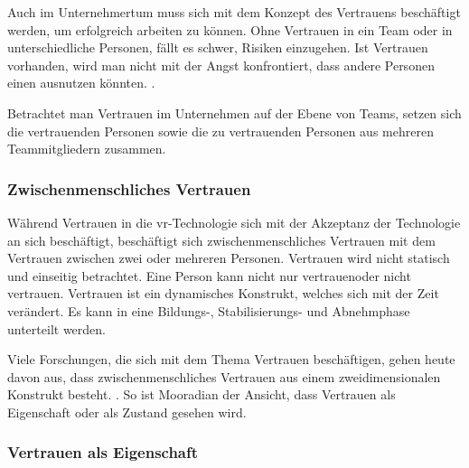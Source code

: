 \documentclass[a4paper,11pt]{article}%
\renewcommand{\\}{\vspace*{0.5\baselineskip} \newline}
\begin{document}
Auch im Unternehmertum muss sich mit dem Konzept des Vertrauens beschäftigt werden, um erfolgreich arbeiten zu können. Ohne Vertrauen in ein Team oder in unterschiedliche Personen, fällt es schwer, Risiken einzugehen. Ist Vertrauen vorhanden, wird man nicht mit der Angst konfrontiert, dass andere Personen einen ausnutzen könnten. \citep[p.1152]{breuer2016does}.

Betrachtet man Vertrauen im Unternehmen auf der Ebene von Teams, setzen sich die vertrauenden Personen sowie die zu vertrauenden Personen aus mehreren Teammitgliedern zusammen.
 

		\subsubsection{Zwischenmenschliches Vertrauen}
Während Vertrauen in die \ac{vr}-Technologie sich mit der Akzeptanz der Technologie an sich beschäftigt, beschäftigt sich zwischenmenschliches Vertrauen mit dem Vertrauen zwischen zwei oder mehreren Personen. \citep{mcknight2011trust}
Vertrauen wird nicht statisch und einseitig betrachtet. Eine Person kann nicht nur \dq vertrauen\dq oder \dq nicht vertrauen\dq. Vertrauen ist ein dynamisches Konstrukt, welches sich mit der Zeit verändert. Es kann in eine Bildungs-, Stabilisierungs- und Abnehmphase unterteilt werden. \citep[p.396]{rousseau1998not}

Viele Forschungen, die sich mit dem Thema Vertrauen beschäftigen, gehen heute davon aus, dass zwischenmenschliches Vertrauen aus einem zweidimensionalen Konstrukt besteht. \citep{johnson2005cognitive} \citep{cook1980new}. So ist Mooradian \citep[p.524-525]{mooradian2006trusts} der Ansicht, dass Vertrauen als \dq{}Eigenschaft\dq{} oder als \dq{}Zustand\dq{} gesehen wird.

	\subsubsection{Vertrauen als Eigenschaft }
\end{document}
